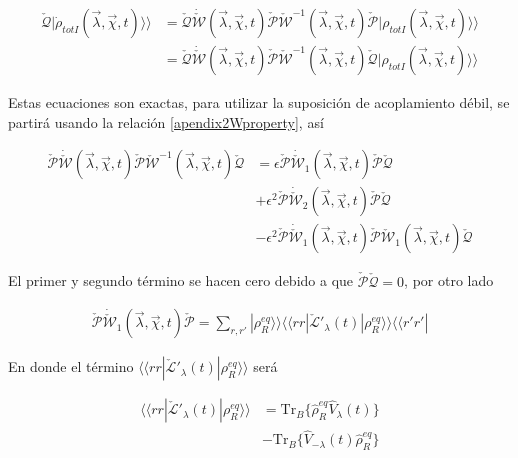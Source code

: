\begin{appendixs}
\begin{align*}
    \check{\mathcal{Q}}|\dot{\rho}_{totI}(\vec{\lambda},\vec{\chi},t) \rangle \rangle & = \check{\mathcal{Q}}\dot{\check{\mathcal{W}}}(\vec{\lambda},\vec{\chi},t)\check{\mathcal{P}}\check{\mathcal{W}}^{-1}(\vec{\lambda},\vec{\chi},t)\check{\mathcal{P}}|\rho_{totI}(\vec{\lambda},\vec{\chi},t)\rangle \rangle \\
     & = \check{\mathcal{Q}}\dot{\check{\mathcal{W}}}(\vec{\lambda},\vec{\chi},t)\check{\mathcal{P}}\check{\mathcal{W}}^{-1}(\vec{\lambda},\vec{\chi},t)\check{\mathcal{Q}}|\rho_{totI}(\vec{\lambda},\vec{\chi},t)\rangle \rangle 
\end{align*}

Estas ecuaciones son exactas, para utilizar la suposición de acoplamiento débil, se partirá usando la relación \ref{apendix2Wproperty}, así

\begin{align*}
    \check{\mathcal{P}}\dot{\check{\mathcal{W}}}(\vec{\lambda},\vec{\chi},t)\check{\mathcal{P}}\check{\mathcal{W}}^{-1}(\vec{\lambda},\vec{\chi},t)\check{\mathcal{Q}} & = \epsilon \check{\mathcal{P}}\dot{\check{\mathcal{W}}}_{1}(\vec{\lambda},\vec{\chi},t) \check{\mathcal{P}}\check{\mathcal{Q}} \\
     & + \epsilon^{2} \check{\mathcal{P}}\dot{\check{\mathcal{W}}}_{2}(\vec{\lambda},\vec{\chi},t) \check{\mathcal{P}}\check{\mathcal{Q}} \\
     & - \epsilon^{2}\check{\mathcal{P}}\dot{\check{\mathcal{W}}}_{1}(\vec{\lambda},\vec{\chi},t)\check{\mathcal{P}} \check{\mathcal{W}}_{1}(\vec{\lambda},\vec{\chi},t)\check{\mathcal{Q}}
\end{align*}

El primer y segundo término se hacen cero debido a que $\check{\mathcal{P}}\check{\mathcal{Q}}=0$, por otro lado

\begin{align*}
    \check{\mathcal{P}}\dot{\check{\mathcal{W}}}_{1}(\vec{\lambda},\vec{\chi},t)\check{\mathcal{P}} = \sum_{r,r'}|\rho^{eq}_{R} \rangle \rangle \langle \langle rr| \check{\mathcal{L}}'_{\lambda}(t)|\rho_{R}^{eq}\rangle \rangle \langle \langle r'r'|
\end{align*}

En donde el término $\langle \langle rr|\check{\mathcal{L}}'_{\lambda}(t)|\rho_{R}^{eq}\rangle \rangle$ será 

\begin{align*}
    \langle \langle rr|\check{\mathcal{L}}'_{\lambda}(t)|\rho_{R}^{eq}\rangle \rangle & = \text{Tr}_{B}\{\hat{\rho}^{eq}_{R}\hat{V}_{\lambda}(t)\} \\
                    & - \text{Tr}_{B}\{\hat{V}_{-\lambda}(t)\hat{\rho}^{eq}_{R}\}
\end{align*}


\end{appendixs}
